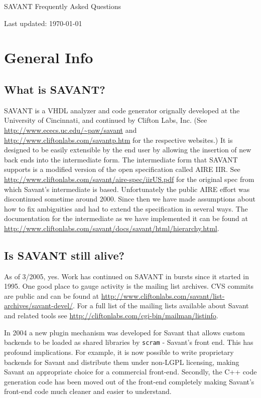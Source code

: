 \documentclass[11pt]{article}
\begin{document}
\begin{center}
SAVANT Frequently Asked Questions

Last updated: \today
\end{center}

\tableofcontents

\section{General Info}
\subsection{What is SAVANT?}
SAVANT is a VHDL analyzer and code generator orignally developed at the
University of Cincinnati, and continued by Clifton Labs, Inc.  (See
\url{http://www.ececs.uc.edu/~paw/savant} and
\url{http://www.cliftonlabs.com/savantp.htm} for the respective websites.)
It is designed to be easily extensible by the end user by allowing the
insertion of new back ends into the intermediate form. The intermediate
form that SAVANT supports is a modified version of the open specification
called AIRE IIR.  See
\url{http://www.cliftonlabs.com/savant/aire-spec/iirUS.pdf} for
the original spec from which Savant's intermediate is based.  Unfortunately
the public AIRE effort was discontinued sometime around 2000.  Since then
we have made assumptions about how to fix ambiguities and had to extend the
specification in several ways.  The documentation for the intermediate as
we have implemented it can be found at
\url{http://www.cliftonlabs.com/savant/docs/savant/html/hierarchy.html}.

\subsection{Is SAVANT still alive?}
As of 3/2005, yes.  Work has continued on SAVANT in bursts since it started
in 1995.  One good place to gauge activity is the mailing list archives.
CVS commits are public and can be found at
\url{http://www.cliftonlabs.com/savant/list-archives/savant-devel/}.  For a
full list of the mailing lists available about Savant and related tools see
\url{http://cliftonlabs.com/cgi-bin/mailman/listinfo}.

In 2004 a new plugin mechanism was developed for Savant that allows custom
backends to be loaded as shared libraries by \texttt{scram} - Savant's
front end.  This has profound implications.  For example, it is now
possible to write proprietary backends for Savant and distribute them under
non-LGPL licensing, making Savant an appropriate choice for a commercial
front-end.  Secondly, the C++ code generation code has been moved out of
the front-end completely making Savant's front-end code much cleaner and
easier to understand.
\end{document}

